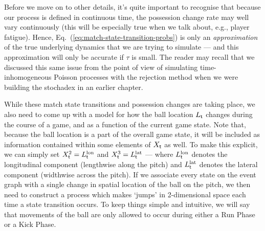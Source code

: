 Before we move on to other details, it's quite important to recognise that because our process is defined in continuous time, the possession change rate may well vary continuously (this will be especially true when we talk about, e.g., player fatigue). Hence, Eq.~(\ref{eq:match-state-transition-probs}) is only an \emph{approximation} of the true underlying dynamics that we are trying to simulate --- and this approximation will only be accurate if $\tau$ is small. The reader may recall that we discussed this same issue from the point of view of simulating time-inhomogeneous Poisson processes with the rejection method when we were building the stochadex in an earlier chapter. 

While these match state transitions and possession changes are taking place, we also need to come up with a model for how the ball location $L_{{\sf t}}$ changes during the course of a game, and as a function of the current game state. Note that, because the ball location is a part of the overall game state, it will be included as information contained within some elements of $X_{{\sf t}}$ as well. To make this explicit, we can simply set $X^2_{{\sf t}}=L^{\rm lon}_{{\sf t}}$ and $X^3_{{\sf t}}=L^{\rm lat}_{{\sf t}}$ --- where $L^{\rm lon}_{{\sf t}}$ denotes the longitudinal component (lengthwise along the pitch) and $L^{\rm lat}_{{\sf t}}$ denotes the lateral component (widthwise across the pitch). If we associate every state on the event graph with a single change in spatial location of the ball on the pitch, we then need to construct a process which makes `jumps' in 2-dimensional space each time a state transition occurs. To keep things simple and intuitive, we will say that movements of the ball are only allowed to occur during either a {\sf Run Phase} or a {\sf Kick Phase}. 

